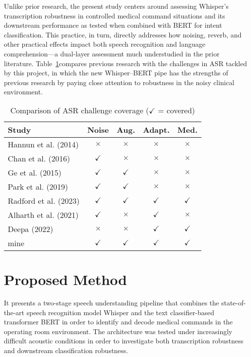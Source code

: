 \documentclass[11pt,a4paper]{article}
\begin{document}
Unlike prior research, the present study centers around assessing Whisper's transcription robustness in controlled medical command situations and its downstream performance as tested when combined with BERT for intent classification. This practice, in turn, directly addresses how noising, reverb, and other practical effects impact both speech recognition and language comprehension—a dual-layer assessment much understudied in the prior literature. Table~\ref{tab:asr_comparison}compares previous research with the challenges in ASR tackled by this project, in which the new Whisper–BERT pipe has the strengths of previous research by paying close attention to robustness in the noisy clinical environment.

\begin{table}[h!]
\centering
\small
\begin{tabular}{l c c c c}
\hline
\textbf{Study} & \textbf{Noise} & \textbf{Aug.} & \textbf{Adapt.} & \textbf{Med.} \\
\hline
Hannun et al. (2014) & $\times$ & $\times$ & $\times$ & $\times$ \\
Chan et al. (2016) & $\checkmark$ & $\times$ & $\times$ & $\times$ \\
Ge et al. (2015) & $\checkmark$ & $\checkmark$ & $\times$ & $\times$ \\
Park et al. (2019) & $\checkmark$ & $\checkmark$ & $\times$ & $\times$ \\
Radford et al. (2023) & $\checkmark$ & $\checkmark$ & $\checkmark$ & $\checkmark$ \\
Alharth et al. (2021) & $\checkmark$ & $\times$ & $\checkmark$ & $\times$ \\
Deepa (2022) & $\times$ & $\times$ & $\checkmark$ & $\checkmark$ \\
mine & $\checkmark$ & $\checkmark$ & $\checkmark$ & $\checkmark$ \\
\hline
\end{tabular}
\caption{\small Comparison of ASR challenge coverage ($\checkmark$ = covered)}
\label{tab:asr_comparison}
\end{table}

\section{Proposed Method}
It presents a two-stage speech understanding pipeline that combines the state-of-the-art speech recognition model Whisper and the text classifier-based transformer BERT in order to identify and decode medical commands in the operating room environment. The architecture was tested under increasingly difficult acoustic conditions in order to investigate both transcription robustness and downstream classification robustness.
\end{document}
